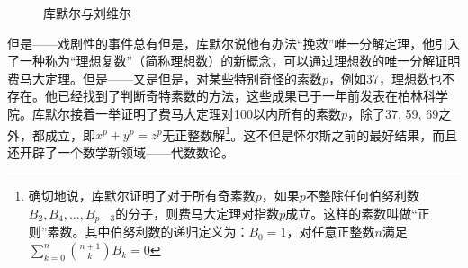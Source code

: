 \documentclass[b5paper]{ctexart}
\begin{document}
\begin{figure}[htbp]
 \centering
 \caption{库默尔与刘维尔}
\end{figure}

但是——戏剧性的事件总有但是，库默尔说他有办法“挽救”唯一分解定理，他引入了一种称为“理想复数”（简称理想数）的新概念，可以通过理想数的唯一分解证明费马大定理。但是——又是但是，对某些特别奇怪的素数$p$，例如37，理想数也不存在。他已经找到了判断奇特素数的方法，这些成果已于一年前发表在柏林科学院。库默尔接着一举证明了费马大定理对100以内所有的素数$p$，除了37, 59, 69之外，都成立，即$x^p + y^p = z^p$无正整数解\footnote{确切地说，库默尔证明了对于所有奇素数$p$，如果$p$不整除任何伯努利数$B_2, B_4, \dotsc, B_{p-3}$的分子，则费马大定理对指数$p$成立。这样的素数叫做“正则”素数。其中伯努利数的递归定义为：$B_0 = 1$，对任意正整数$n$满足$\displaystyle \sum_{k = 0}^{n}\binom{n + 1}{k} B_k = 0$}。这不但是怀尔斯之前的最好结果，而且还开辟了一个数学新领域——代数数论。
\end{document}
